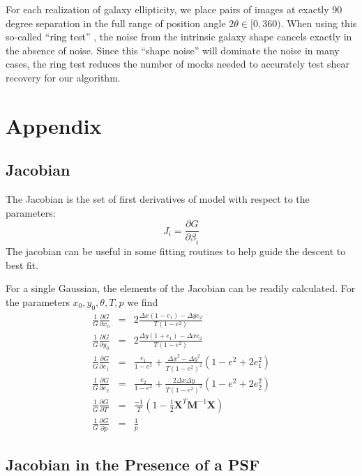 \documentclass[12pt,preprint]{aastex}
\newcommand{\M}{\textbf{M}}
\newcommand{\X}{\textbf{X}}
\newcommand{\Dx}{\ensuremath{\Delta x}}
\newcommand{\Dy}{\ensuremath{\Delta y}}
\begin{document}
For each realization of galaxy ellipticity, we place pairs of images at exactly
90 degree separation in the full range of position angle $2 \theta \in
[0,360)$.  When using this so-called ``ring test'' \citep{Nakajima2007}, the
noise from the intrinsic galaxy shape cancels exactly in the absence of noise.
Since this ``shape noise'' will dominate the noise in many cases, the ring test
reduces the number of mocks needed to accurately test shear recovery for our
algorithm.





\appendix 

\section{Appendix}
\subsection{Jacobian}

The Jacobian is the set of first derivatives of model with respect
to the parameters:
\begin{equation}
J_i = \frac{\partial G}{\partial \beta_i}
\end{equation}
The jacobian can be useful in some fitting routines to help guide the descent
to best fit.

For a single Gaussian, the elements of the Jacobian can be readily
calculated.  For the parameters $x_0,y_0,\theta,T,p$ we find
\begin{eqnarray}
\frac{1}{G} \frac{\partial G}{\partial x_0}
    & = & 2 \frac{ \Dx (1-e_1) - \Dy e_2 }{T (1-e^2)} \\
\frac{1}{G} \frac{\partial G}{\partial y_0}
    & = & 2 \frac{ \Dy (1+e_1) - \Dx e_2 }{T (1-e^2)} \\
\frac{1}{G} \frac{\partial G}{\partial e_1}
  & = & \frac{e_1}{1-e^2} + \frac{\Dx^2-\Dy^2}{T (1-e^2)^2} (1-e^2 + 2 e_1^2) \\
\frac{1}{G} \frac{\partial G}{\partial e_2}
  & = & \frac{e_2}{1-e^2} + \frac{2 \Dx \Dy}{T (1-e^2)^2} (1-e^2 + 2 e_2^2) \\
\frac{1}{G} \frac{\partial G}{\partial T}
  & = & \frac{-1}{T} \left( 1 - \frac{1}{2} \X^T \M^{-1} \X  \right)  \\
\frac{1}{G} \frac{\partial G}{\partial p}
  & = & \frac{1}{p}
\end{eqnarray}

\subsection{Jacobian in the Presence of a PSF}
\end{document}
